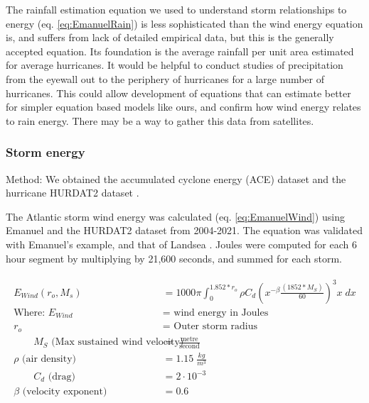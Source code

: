 \documentclass{article}
\begin{document}
The rainfall estimation equation we used to understand storm relationships to energy (eq. \ref{eq:EmanuelRain}) is less sophisticated than the wind energy equation is, and suffers from lack of detailed empirical data, but this is the generally accepted equation. Its foundation is the average rainfall per unit area estimated for average hurricanes. It would be helpful to conduct studies of precipitation from the eyewall out to the periphery of hurricanes for a large number of hurricanes. This could allow development of equations that can estimate better for simpler equation based models like ours, and confirm how wind energy relates to rain energy. There may be a way to gather this data from satellites. 

\subsubsection{Storm energy}
\label{lb:StormEnergy}
Method: We obtained the accumulated cyclone energy (ACE) dataset \cite{Knapp2018_IBTrACSdatasetV4} and the hurricane HURDAT2 dataset \cite{Landsea2013AtlanticHurricaneDatabaseUncertaintyandPresentationofaNewDatabaseFormat,hurdat2-1851-2021-041922}. 

The Atlantic storm wind energy was calculated (eq. \ref{eq:EmanuelWind}) using Emanuel \cite[p 107]{Emanuel1999PowerOfHurricane} \cite[p 595, eq. 48]{Emanuel1986AnAirSeaInteractionTheoryforTropicalCyclonesPartISteadyStateMaintenance} and the HURDAT2 dataset from 2004-2021. The equation was validated with Emanuel's example, and that of Landsea \cite{Landsea2018Energy400to1}.  Joules were computed for each 6 hour segment by multiplying by 21,600 seconds, and summed for each storm.

\begin{align}
    \begin{split} \label{eq:EmanuelWind}
 E_{Wind}(r_o, M_{s}) &=   1000 \pi \int_{0}^{1.852*r_o} \rho C_d (x^{-\beta} \frac{(1852*M_{S})}{60})^3 x \; dx\\
 \text{Where: } E_{Wind} &= \text{ wind energy in Joules} \\
 r_o &=\text{ Outer storm radius} \\\qquad M_{S} \text{ (Max sustained wind velocity)} &= \; \frac{\text{metre}}{\text{second}} \\ 
 \rho \text{ (air density)} &= 1.15 \;\frac{kg}{m^3} \\ \qquad C_d \text{ (drag)} &= 2\cdot10^{-3}  \\
 \beta \text{ (velocity exponent)}  &= 0.6 
    \end{split}
\end{align}
\end{document}
